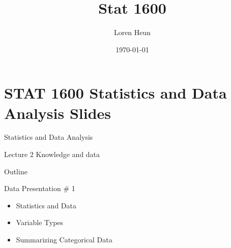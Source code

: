 \documentclass[14pt]{beamer}\usepackage[]{graphicx}\usepackage[]{color}
\title{Stat 1600}
\author{Loren Heun}
\institute{WMU}
\date{\today}
\begin{document}
\frame{\titlepage}











\section{STAT 1600 Statistics and Data Analysis Slides}

\begin{frame}[fragile]{Statistics and Data Analysis}

Lecture 2 Knowledge and data

\end{frame}

\begin{frame}[fragile]{Outline}

Data Presentation \# 1

\begin{itemize}
\item Statistics and Data
\item Variable Types
\item Summarizing Categorical Data
\end{itemize}
\end{frame}
\end{document}
